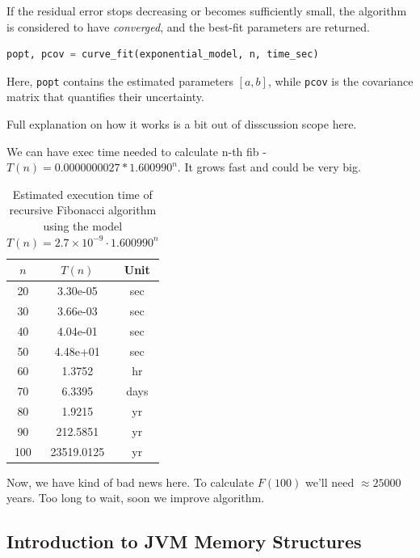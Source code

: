 \documentclass{article}
\begin{document}
\medskip
\noindent
If the residual error stops decreasing or becomes sufficiently small, the algorithm is considered to have \emph{converged}, and the best-fit parameters are returned.

\begin{lstlisting}[language=Python]
popt, pcov = curve_fit(exponential_model, n, time_sec)
\end{lstlisting}

Here, \texttt{popt} contains the estimated parameters $[a, b]$, while \texttt{pcov} is the covariance matrix that quantifies their uncertainty.

Full explanation on how it works is a bit out of disscussion scope here.

We can have exec time needed to calculate n-th fib - $T(n) = 0.0000000027 * 1.600990^n$. It grows fast and could be very big.

\begin{table}[h]
	\centering
	\caption{Estimated execution time of recursive Fibonacci algorithm using the model $T(n) = 2.7 \times 10^{-9} \cdot 1.600990^n$}
	\begin{tabular}{|c|c|c|}
		\hline
		$n$ & $T(n)$ & Unit \\
		\hline
		20 & 3.30e-05 & sec \\ 
		\hline
		30 & 3.66e-03 & sec \\ 
		\hline
		40 & 4.04e-01 & sec \\ 
		\hline
		50 & 4.48e+01 & sec \\ 
		\hline
		60 & 1.3752 & hr \\ 
		\hline
		70 & 6.3395 & days \\ 
		\hline
		80 & 1.9215 & yr \\ 
		\hline
		90 & 212.5851 & yr \\ 
		\hline
		100 & 23519.0125 & yr \\ 
		\hline
		
	\end{tabular}
\end{table}

Now, we have kind of bad news here. To calculate $F(100)$ we'll need $\approx 25 000$ years. Too long to wait, soon we improve algorithm.

\subsection{Introduction to JVM Memory Structures}
\end{document}
